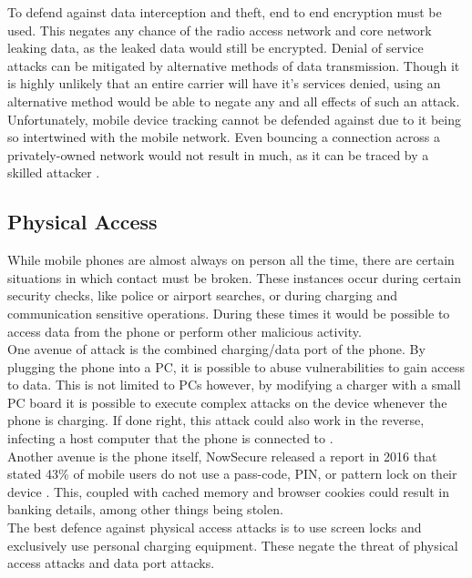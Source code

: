 To defend against data interception and theft, end to end encryption must be used.
This negates any chance of the radio access network and core network leaking data, as the leaked data would still be encrypted.
Denial of service attacks can be mitigated by alternative methods of data transmission.
Though it is highly unlikely that an entire carrier will have it’s services denied, using an alternative method would be able to negate any and all effects of such an attack.
Unfortunately, mobile device tracking cannot be defended against due to it being so intertwined with the mobile network.
Even bouncing a connection across a privately-owned network would not result in much, as it can be traced by a skilled attacker \cite{Reference13}.


\subsection{Physical Access}

\label{Ch2 Sec2 Sub4}

While mobile phones are almost always on person all the time, there are certain situations in which contact must be broken.
These instances occur during certain security checks, like police or airport searches, or during charging and communication sensitive operations.
During these times it would be possible to access data from the phone or perform other malicious activity.\\
One avenue of attack is the combined charging/data port of the phone.
By plugging the phone into a PC, it is possible to abuse vulnerabilities to gain access to data.
This is not limited to PCs however, by modifying a charger with a small PC board it is possible to execute complex attacks on the device whenever the phone is charging.
If done right, this attack could also work in the reverse, infecting a host computer that the phone is connected to \cite{Reference13}.\\
Another avenue is the phone itself, NowSecure released a report in 2016 that stated 43\% of mobile users do not use a pass-code, PIN, or pattern lock on their device \cite{Reference18}.
This, coupled with cached memory and browser cookies could result in banking details, among other things being stolen.\\

The best defence against physical access attacks is to use screen locks and exclusively use personal charging equipment.
These negate the threat of physical access attacks and data port attacks.\\


